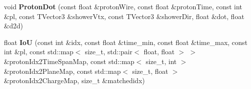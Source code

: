 \begin{DoxyCompactItemize}
\item 
void {\bfseries Proton\+Dot} (const float \&proton\+Wire, const float \&proton\+Time, const int \&pl, const T\+Vector3 \&shower\+Vtx, const T\+Vector3 \&shower\+Dir, float \&dot, float \&d2d)\hypertarget{classProtonTruthStudies_a2d14a1b19fd97a5e123e022ab927f448}{}\label{classProtonTruthStudies_a2d14a1b19fd97a5e123e022ab927f448}

\item 
float {\bfseries IoU} (const int \&idx, const float \&time\+\_\+min, const float \&time\+\_\+max, const int \&pl, const std\+::map$<$ size\+\_\+t, std\+::pair$<$ float, float $>$ $>$ \&proton\+Idx2\+Time\+Span\+Map, const std\+::map$<$ size\+\_\+t, int $>$ \&proton\+Idx2\+Plane\+Map, const std\+::map$<$ size\+\_\+t, float $>$ \&proton\+Idx2\+Charge\+Map, size\+\_\+t \&matchedidx)\hypertarget{classProtonTruthStudies_a0ab41a24c0fd5197a24dffecd076655c}{}\label{classProtonTruthStudies_a0ab41a24c0fd5197a24dffecd076655c}

\end{DoxyCompactItemize}
